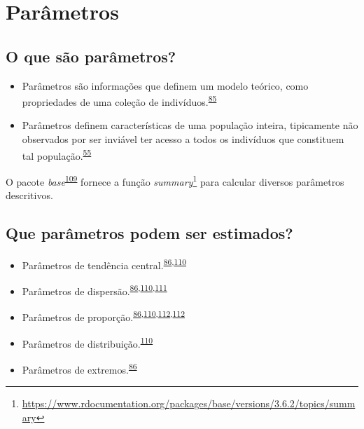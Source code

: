 \documentclass[
  a4paper,
]{book}
\renewcommand{\href}[2]{#2\footnote{\url{#1}}}
\newenvironment{infobox}[1]
  {
  \begin{itemize}
  \renewcommand{\labelitemi}{
    \raisebox{-.7\height}[0pt][0pt]{
      {\setkeys{Gin}{width=3em,keepaspectratio}
        \texttt{[image: \#1]}}
    }
  }
  \setlength{\fboxsep}{1em}
  \begin{blackbox}
  \item
  }
  {
  \end{blackbox}
  \end{itemize}
  }
\begin{document}
\hypertarget{parametros}{%
\section{Parâmetros}\label{parametros}}

\hypertarget{o-que-suxe3o-paruxe2metros}{%
\subsection{O que são parâmetros?}\label{o-que-suxe3o-paruxe2metros}}

\begin{itemize}
\item
  Parâmetros são informações que definem um modelo teórico, como propriedades de uma coleção de indivíduos.\textsuperscript{\protect\hyperlink{ref-Altman1999}{85}}
\item
  Parâmetros definem características de uma população inteira, tipicamente não observados por ser inviável ter acesso a todos os indivíduos que constituem tal população.\textsuperscript{\protect\hyperlink{ref-vetter2017}{55}}
\end{itemize}

\begin{infobox}{images/Rlogo}
O pacote \emph{base}\textsuperscript{\protect\hyperlink{ref-base-6}{109}} fornece a função \href{https://www.rdocumentation.org/packages/base/versions/3.6.2/topics/summary}{\emph{summary}} para calcular diversos parâmetros descritivos.

\end{infobox}

\hypertarget{que-paruxe2metros-podem-ser-estimados}{%
\subsection{Que parâmetros podem ser estimados?}\label{que-paruxe2metros-podem-ser-estimados}}

\begin{itemize}
\item
  Parâmetros de tendência central.\textsuperscript{\protect\hyperlink{ref-Ali2016}{86},\protect\hyperlink{ref-kanji2006}{110}}
\item
  Parâmetros de dispersão.\textsuperscript{\protect\hyperlink{ref-Ali2016}{86},\protect\hyperlink{ref-kanji2006}{110},\protect\hyperlink{ref-Curran-Everett2008}{111}}
\item
  Parâmetros de proporção.\textsuperscript{\protect\hyperlink{ref-Ali2016}{86},\protect\hyperlink{ref-kanji2006}{110},\protect\hyperlink{ref-Altman1994}{112},\protect\hyperlink{ref-Altman1994}{112}}
\item
  Parâmetros de distribuição.\textsuperscript{\protect\hyperlink{ref-kanji2006}{110}}
\item
  Parâmetros de extremos.\textsuperscript{\protect\hyperlink{ref-Ali2016}{86}}
\end{itemize}
\end{document}
